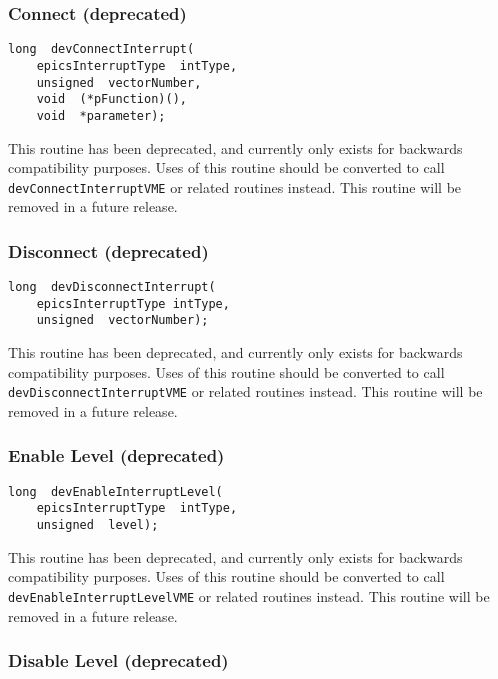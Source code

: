 \subsubsection{Connect (deprecated)}

\begin{verbatim}
long  devConnectInterrupt(
    epicsInterruptType  intType,
    unsigned  vectorNumber,
    void  (*pFunction)(),
    void  *parameter);
\end{verbatim}

This routine has been deprecated, and currently only exists for backwards compatibility purposes. Uses of this routine 
should be converted to call \verb|devConnectInterruptVME| or related routines instead. This routine will be removed in a 
future release.

\subsubsection{Disconnect (deprecated)}

\begin{verbatim}
long  devDisconnectInterrupt(
    epicsInterruptType intType,
    unsigned  vectorNumber);
\end{verbatim}

This routine has been deprecated, and currently only exists for backwards compatibility purposes. Uses of this routine 
should be converted to call \verb|devDisconnectInterruptVME| or related routines instead. This routine will be removed 
in a future release.

\subsubsection{Enable Level (deprecated)}

\begin{verbatim}
long  devEnableInterruptLevel(
    epicsInterruptType  intType,
    unsigned  level);
\end{verbatim}

This routine has been deprecated, and currently only exists for backwards compatibility purposes. Uses of this routine 
should be converted to call \verb|devEnableInterruptLevelVME| or related routines instead. This routine will be removed 
in a future release.

\subsubsection{Disable Level (deprecated)}

